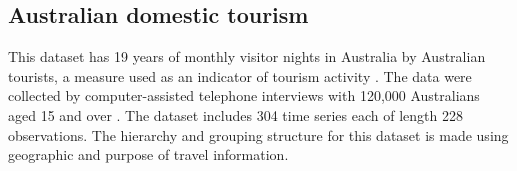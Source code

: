 \documentclass[11pt,a4paper,]{article}
\begin{document}
\hypertarget{australian-domestic-tourism}{%
\subsection{Australian domestic tourism}\label{australian-domestic-tourism}}

This dataset has 19 years of monthly visitor nights in Australia by Australian tourists, a measure used as an indicator of tourism activity \autocite{mint2018}. The data were collected by computer-assisted telephone interviews with 120,000 Australians aged 15 and over \autocite{researchAustralia2005}. The dataset includes 304 time series each of length 228 observations. The hierarchy and grouping structure for this dataset is made using geographic and purpose of travel information.

\begingroup\fontsize{9}{11}\selectfont
\end{document}
